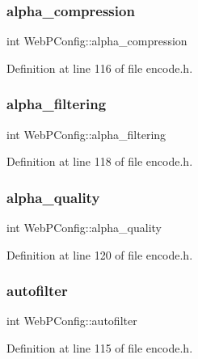 \subsubsection{\texorpdfstring{alpha\_compression}{alpha\_compression}}
{\footnotesize\ttfamily int Web\+P\+Config\+::alpha\+\_\+compression}



Definition at line 116 of file encode.\+h.

\mbox{\label{struct_web_p_config_a1657d146a2545b437f93d3b5d2cb2648}} 
\subsubsection{\texorpdfstring{alpha\_filtering}{alpha\_filtering}}
{\footnotesize\ttfamily int Web\+P\+Config\+::alpha\+\_\+filtering}



Definition at line 118 of file encode.\+h.

\mbox{\label{struct_web_p_config_ab2955a1dcb8c70b5c7418dc909ba6a3a}} 
\subsubsection{\texorpdfstring{alpha\_quality}{alpha\_quality}}
{\footnotesize\ttfamily int Web\+P\+Config\+::alpha\+\_\+quality}



Definition at line 120 of file encode.\+h.

\mbox{\label{struct_web_p_config_a4155b355a8af62aa0bef254d94cb70d1}} 
\subsubsection{\texorpdfstring{autofilter}{autofilter}}
{\footnotesize\ttfamily int Web\+P\+Config\+::autofilter}



Definition at line 115 of file encode.\+h.

